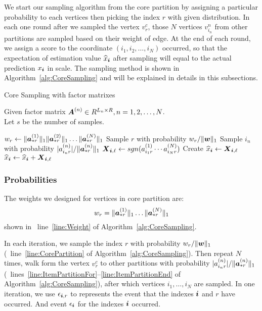 \documentclass[letterpaper]{article}
\newcommand{\Sca}[3]{{#1}^{(#2)}_{i_#2#3}}%
\newcommand{\anr}[2]{\Sca{a}{#1}{#2}}
\newcommand{\score}[1]{\M{X}_{\V{i},#1}}
\newcommand{\V}[1]{{\bm{{\MakeLowercase{#1}}}}}
\newcommand{\VnC}[3]{\V{#1}^{(#2)}_{#3}}
\newcommand{\Nrocl}[2]{\norm{\VnC{a}{#1}{*#2}}{1}}
\newcommand{\Vacol}[1]{\V{a}^{(#1)}_{*r}}
\newcommand{\M}[1]{{\bm{{\MakeUppercase{#1}}}}}
\newcommand{\norm}[2]{\|#1\|_{#2}}
\newcommand{\Alg}[1] {Algorithm~\ref{alg:#1}}
\newcommand{\AlgLine}[2]{line~\ref{line:#2} of Algorithm~\ref{alg:#1}}
\newcommand{\AlgLines}[3]{lines~\ref{line:#2}--\ref{line:#3} of Algorithm~\ref{alg:#1}}
\newcommand{\coord}{(i_1,i_2,\ldots,i_N)}
\newcommand{\WeightR}{\Nrocl{1}{r}\ldots\Nrocl{N}{r}}
\newcommand{\predx}{\widehat{x}_{\V{i}}}
\begin{document}
We start our sampling algorithm from the core partition
by assigning a particular probability to each vertices
then picking the index $r$ with given  distribution.
In each one round after we sampled the vertex $v^c_r$,
those $N$ vertices $v^{n}_{i_n}$ from other partitions are sampled
based on their weight of edge.
At the end of each round,
we assign a score to the coordinate $\coord$ occurred,
so that the expectation of estimation value $\widehat{x}_\V{i}$
after sampling will equal to the actual prediction $x_\V{i}$ in scale.
The sampling method is shown in \Alg{CoreSampling} and will be explained in details
in this subsections.
\begin{algorithm}[t]
    \caption{Core Sampling with factor matrixes}
    \label{alg:CoreSampling}
    Given factor matrix $\M{A}^{(n)}\in R^{L_n\times R}, n = 1,2,\ldots,N$.\\
    Let $s$ be the number of samples.
    \begin{algorithmic}[1]
    \State $w_r \leftarrow \Nrocl{1}{r}\norm{\Vacol{2}}{1}\ldots\Nrocl{N}{r}$
    \label{line:Weight}
    \EndFor
    \State Sample $r$ with probability $w_r/\norm{\V{W}}{1}$
    \label{line:CorePartition}
    \label{line:ItemPartitionFor}
    \State Sample $i_n$ with probability $|\anr{n}{r}|/\norm{\Vacol{n}}{1}$
    \EndFor
    \label{line:ItemPartitionEnd}
    \State
    \label{line:Scoring}
        $\score{\ell} \leftarrow sgn(\anr{1}{r}\cdots\anr{N}{r})$
    \If {$\V{i}=\coord$ has not been sampled}
    \State  Create $\predx \leftarrow \score{\ell} $
    \Else
    \State $\predx \leftarrow \predx + \score{\ell}$
    \EndIf
    \EndFor
    \label{line:ScoringEnd}
    \end{algorithmic}
\end{algorithm}

\subsubsection{Probabilities}
The weights we designed for vertices in core partition are:
\[
    w_r = \WeightR
\]
shown in ~\AlgLine{CoreSampling}{Weight}.

In each iteration, we sample the index $r$
with probability $w_r/\norm{\V{w}}{1}$
(~\AlgLine{CoreSampling}{CorePartition}).
Then repeat $N$ times,
walk form the vertex $v^c_r$ to other partitions with probability
$|\anr{n}{r}|/\norm{\Vacol{n}}{1}$
(~\AlgLines{CoreSampling}{ItemPartitionFor}{ItemPartitionEnd}),
after which vertices $i_1,\ldots,i_N$ are sampled.
In one iteration, we use $\epsilon_{\V{i},r}$ to represents the event that 
the indexes $\V{i}$ and $r$ have occurred.
And event $\epsilon_{\V{i}}$ for the indexes $\V{i}$ occurred.
\end{document}
